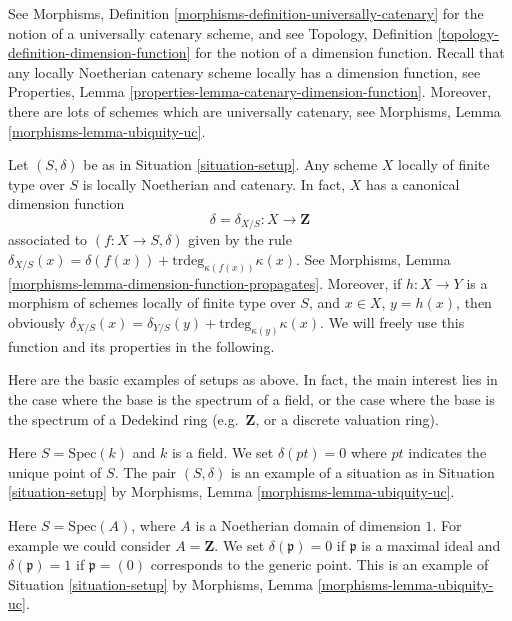 \noindent
See Morphisms, Definition \ref{morphisms-definition-universally-catenary}
for the notion of a universally catenary scheme, and see
Topology, Definition \ref{topology-definition-dimension-function}
for the notion of a dimension function. Recall that any locally
Noetherian catenary scheme locally has a dimension function, see
Properties, Lemma \ref{properties-lemma-catenary-dimension-function}.
Moreover, there are lots of schemes which are universally catenary,
see Morphisms, Lemma \ref{morphisms-lemma-ubiquity-uc}.

\medskip\noindent
Let $(S, \delta)$ be as in Situation \ref{situation-setup}.
Any scheme $X$ locally of finite type over $S$ is locally Noetherian
and catenary. In fact, $X$ has a canonical dimension function
$$
\delta = \delta_{X/S} : X \longrightarrow \mathbf{Z}
$$
associated to $(f : X \to S, \delta)$ given by the rule
$\delta_{X/S}(x) = \delta(f(x)) + \text{trdeg}_{\kappa(f(x))}\kappa(x)$.
See Morphisms, Lemma \ref{morphisms-lemma-dimension-function-propagates}.
Moreover, if $h : X \to Y$ is a morphism of schemes locally of finite
type over $S$, and $x \in X$, $y = h(x)$,
then obviously
$\delta_{X/S}(x) = \delta_{Y/S}(y) + \text{trdeg}_{\kappa(y)}\kappa(x)$.
We will freely use this function and its properties in the following.

\medskip\noindent
Here are the basic examples of setups as above.
In fact, the main interest lies in the case where the base
is the spectrum of a field, or the case where the base
is the spectrum of a Dedekind ring (e.g.\ $\mathbf{Z}$,
or a discrete valuation ring).

\begin{example}
\label{example-field}
Here $S = \text{Spec}(k)$ and $k$ is a field.
We set $\delta(pt) = 0$ where $pt$ indicates the unique point of $S$.
The pair $(S, \delta)$ is an example of a situation as in
Situation \ref{situation-setup} by
Morphisms, Lemma \ref{morphisms-lemma-ubiquity-uc}.
\end{example}

\begin{example}
\label{example-domain-dimension-1}
Here $S = \text{Spec}(A)$, where $A$ is a Noetherian domain
of dimension $1$.
For example we could consider $A = \mathbf{Z}$.
We set $\delta(\mathfrak p) = 0$ if
$\mathfrak p$ is a maximal ideal and $\delta(\mathfrak p) = 1$
if $\mathfrak p = (0)$ corresponds to the generic point.
This is an example of Situation \ref{situation-setup} by
Morphisms, Lemma \ref{morphisms-lemma-ubiquity-uc}.
\end{example}

